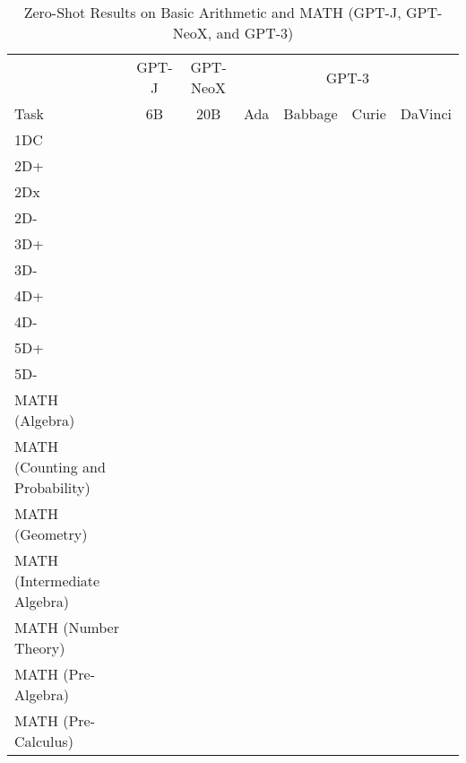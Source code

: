 \documentclass[11pt]{article}
\begin{document}
{\begin{landscape}
\begin{table*}
\centering \begin{tabular}{l c c c c c c } \\ 
& GPT-J & GPT-NeoX & \multicolumn{4}{c}{GPT-3} \\
Task & 6B & 20B & Ada & Babbage & Curie & DaVinci \\ \toprule
1DC &  &  &  &  &  &  \\ 
2D+ &  &  &  &  &  &  \\ 
2Dx &  &  &  &  &  &  \\ 
2D- &  &  &  &  &  &  \\ 
3D+ &  &  &  &  &  &  \\ 
3D- &  &  &  &  &  &  \\ 
4D+ &  &  &  &  &  &  \\ 
4D- &  &  &  &  &  &  \\ 
5D+ &  &  &  &  &  &  \\ 
5D- &  &  &  &  &  &  \\ 
MATH (Algebra) &  &  &  &  &  &  \\ 
MATH (Counting and Probability) &  &  &  &  &  &  \\ 
MATH (Geometry) &  &  &  &  &  &  \\ 
MATH (Intermediate Algebra) &  &  &  &  &  &  \\ 
MATH (Number Theory) &  &  &  &  &  &  \\ 
MATH (Pre-Algebra) &  &  &  &  &  &  \\ 
MATH (Pre-Calculus) &  &  &  &  &  &  \\ 

\bottomrule 
\end{tabular}
\caption{Zero-Shot Results on Basic Arithmetic and MATH (GPT-J, GPT-NeoX, and GPT-3)}\label{tab:math_gpt}
\end{table*}


\end{landscape}}
\end{document}
